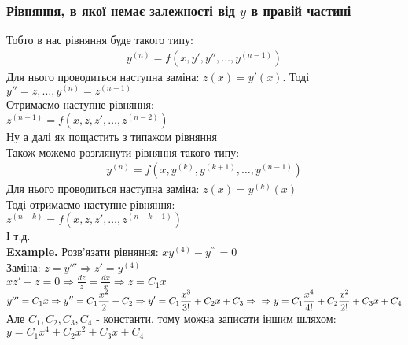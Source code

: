 \documentclass[a4paper, 14pt]{extarticle}
\def\huge{\displaystyle}
\def\bigline{\vspace{5mm}\\}
\begin{document}
	\subsubsection{Рівняння, в якої немає залежності від $y$ в правій частині}
	Тобто в нас рівняння буде такого типу:
	\begin{align*}
	y^{(n)} = f(x,y',y'',\dots, y^{(n-1)})
	\end{align*}
	Для нього проводиться наступна заміна: $z(x) = y'(x)$. Тоді\\
	$y'' = z, \dots, y^{(n)} = z^{(n-1)}$\\
	Отримаємо наступне рівняння:\\
	$z^{(n-1)}=f(x,z,z',\dots,z^{(n-2)})$\\
	Ну а далі як пощастить з типажом рівняння
	\bigline
	Також можемо розглянути рівняння такого типу:
	\begin{align*}
	y^{(n)} = f(x,y^{(k)},y^{(k+1)},\dots, y^{(n-1)})
	\end{align*}
	Для нього проводиться наступна заміна: $z(x) = y^{(k)}(x)$\\
	Тоді отримаємо наступне рівняння:\\
	$z^{(n-k)}=f(x,z,z',\dots,z^{(n-k-1)})$\\
	І т.д.
	\bigline
	\textbf{Example.} Розв'язати рівняння: $xy^{(4)} - y^{'''}=0$\\
	Заміна: $z = y''' \Rightarrow z' = y^{(4)}$\\
	$xz'-z=0 \Rightarrow \huge \frac{dz}{z} = \frac{dx}{x} \Rightarrow z = C_1x$\\
	$y''' = C_1x \Rightarrow \huge y'' = C_1 \frac{x^2}{2} + C_2 \Rightarrow y' = C_1 \frac{x^3}{3!} + C_2x + C_3 \Rightarrow \\ \Rightarrow y = C_1 \frac{x^4}{4!} + C_2 \frac{x^2}{2!}+ C_3x + C_4$\\
	Але $C_1,C_2,C_3,C_4$ - константи, тому можна записати іншим шляхом:\\
	$y = C_1x^4 + C_2x^2 + C_3x + C_4$\\
	
\end{document}
